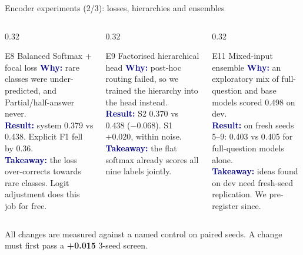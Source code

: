 \documentclass[aspectratio=169,10pt]{beamer}
\newcommand{\expsize}{\scriptsize}
\newcommand{\hl}[1]{\textcolor{accent}{\textbf{#1}}}
\newcommand{\expcard}[4]{%
  \begin{block}{#1}\expsize
    \textcolor{navy}{\textbf{Why:}} #2\\[1pt]
    \textcolor{navy}{\textbf{Result:}} #3\\[1pt]
    \textcolor{navy}{\textbf{Takeaway:}} #4
  \end{block}}
\begin{document}
\begin{frame}{Encoder experiments (2/3): losses, hierarchies and ensembles}
  \renewcommand{\expsize}{\small}
  \begin{columns}[T]
    \begin{column}{0.32\textwidth}
      \expcard{E8 \quad Balanced Softmax + focal loss}
        {rare classes were under-predicted, and Partial/half-answer never.}
        {system 0.379 vs 0.438. Explicit F1 fell by 0.36.}
        {the loss over-corrects towards rare classes. Logit adjustment does this job for free.}
    \end{column}
    \begin{column}{0.32\textwidth}
      \expcard{E9 \quad Factorised hierarchical head}
        {post-hoc routing failed, so we trained the hierarchy into the head instead.}
        {S2 0.370 vs 0.438 ($-$0.068). S1 +0.020, within noise.}
        {the flat softmax already scores all nine labels jointly.}
    \end{column}
    \begin{column}{0.32\textwidth}
      \expcard{E11 \quad Mixed-input ensemble}
        {an exploratory mix of full-question and base models scored 0.498 on dev.}
        {on fresh seeds 5--9: 0.403 vs 0.405 for full-question models alone.}
        {ideas found on dev need fresh-seed replication. We pre-register since.}
    \end{column}
  \end{columns}
  \vspace{8pt}
  \centering\small All changes are measured against a named control on paired seeds. A change must first pass a \hl{+0.015} 3-seed screen.
\end{frame}
\end{document}
